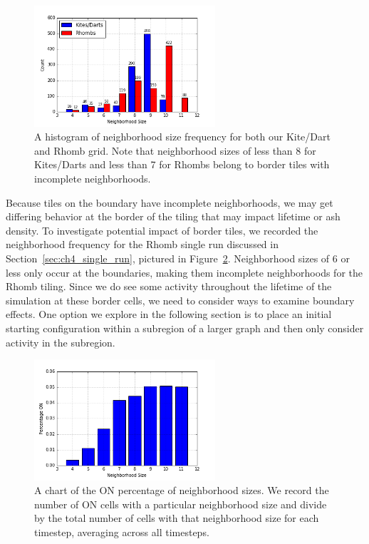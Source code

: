 \documentclass[a4paper,11pt,twoside]{report}
\begin{document}
\begin{figure}[htp]
\centering
\includegraphics[width=0.6\textwidth]{ch4_figs/both_neighborhood_size}
\caption[Kite/Dart and Rhomb Neighborhood Size Frequency]{
	A histogram of neighborhood size frequency for both our Kite/Dart and Rhomb grid. Note that neighborhood sizes of less than 8 for Kites/Darts and less than 7 for Rhombs belong to border tiles with incomplete neighborhoods.
}
\label{fig:both_neighborhood}
\end{figure}

Because tiles on the boundary have incomplete neighborhoods, we may get differing behavior at the border of the tiling that may impact lifetime or ash density. To investigate potential impact of border tiles, we recorded the neighborhood frequency for the Rhomb single run discussed in Section~\ref{sec:ch4_single_run}, pictured in Figure~\ref{fig:crh_single_nbd}. Neighborhood sizes of 6 or less only occur at the boundaries, making them incomplete neighborhoods for the Rhomb tiling. Since we do see some activity throughout the lifetime of the simulation at these border cells, we need to consider ways to examine boundary effects. One option we explore in the following section is to place an initial starting configuration within a subregion of a larger graph and then only consider activity in the subregion.

\begin{figure}[htp]
\centering
\includegraphics[width=0.6\textwidth]{ch4_figs/crh_666_neighbor_on_percent}
\caption[Rhomb Single Run Neighborhood ON Percentage]{
	A chart of the ON percentage of neighborhood sizes. We record the number of ON cells with a particular neighborhood size and divide by the total number of cells with that neighborhood size for each timestep, averaging across all timesteps.
}
\label{fig:crh_single_nbd}
\end{figure}
\end{document}
